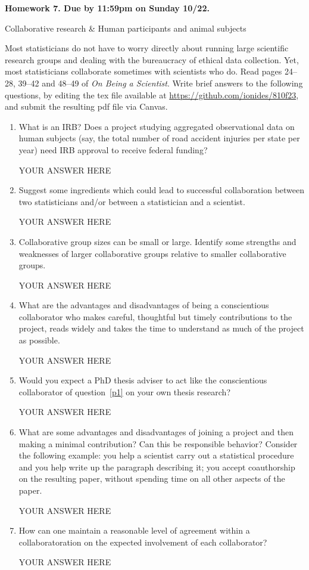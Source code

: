 \documentclass[12pt]{article}
\begin{document}
\begin{center}\bf
Homework 7. Due by 11:59pm on Sunday 10/22.

Collaborative research \& Human participants and animal subjects

\end{center}
Most statisticians do not have to worry directly about running large scientific research groups and dealing with the bureaucracy of ethical data collection. Yet, most statisticians collaborate sometimes with scientists who do. Read pages 24--28, 39--42 and 48--49 of {\em On Being a Scientist}.  Write brief answers to the following questions, by editing the tex file available at \url{https://github.com/ionides/810f23}, and submit the resulting pdf file via Canvas.

\begin{enumerate}

\item What is an IRB? Does a project studying aggregated observational data on human subjects (say, the total number of road accident injuries per state per year) need IRB approval to receive federal funding?

YOUR ANSWER HERE

\item Suggest some ingredients which could lead to successful collaboration between two statisticians and/or between a statistician and a scientist.

YOUR ANSWER HERE

\item Collaborative group sizes can be small or large. Identify some strengths and weaknesses of larger collaborative groups relative to smaller collaborative groups.

YOUR ANSWER HERE
 
\item \label{p1} What are the advantages and disadvantages of being a conscientious collaborator who makes careful, thoughtful but timely contributions to the project, reads widely and takes the time to understand as much of the project as possible.

YOUR ANSWER HERE

\item Would you expect a PhD thesis adviser to act like the conscientious collaborator of question~\ref{p1} on your own thesis research? 

YOUR ANSWER HERE

\item What are some advantages and disadvantages of joining a project and then making a minimal contribution? Can this be responsible behavior? Consider the following example: you help a scientist carry out a statistical procedure and you help write up the paragraph describing it; you accept coauthorship on the resulting paper, without spending time on all other aspects of the paper.

YOUR ANSWER HERE

\item How can one maintain a reasonable level of agreement within a collaboratoration on the expected involvement of each collaborator?

YOUR ANSWER HERE

\end{enumerate}
\end{document}
